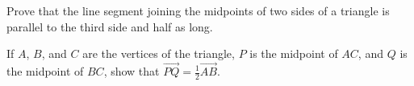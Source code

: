 
\begin{Exercise}[
name={},
title={}, 
difficulty=0,
origin={\cite{SM}}]\label{chordOfTriangle}
Prove that the line segment joining the midpoints of two sides of a triangle is parallel to the third side and half as long.

\end{Exercise}

\begin{Answer}
If $A$, $B$, and $C$ are the vertices of the triangle, $P$ is the midpoint of $AC$,  and $Q$ is the midpoint of $BC$, show that $\overrightarrow{PQ} = \frac{1}{2}\overrightarrow{AB}$.
\end{Answer}
